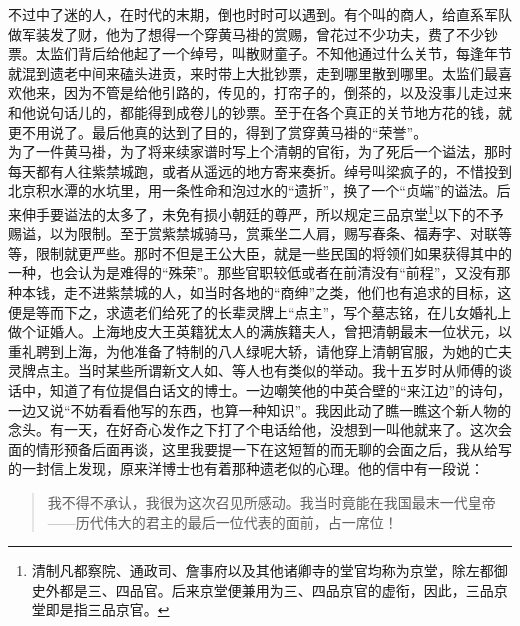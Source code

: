 不过中了迷的人，在时代的末期，倒也时时可以遇到。有个叫的商人，给直系军队做军装发了财，他为了想得一个穿黄马褂的赏赐，曾花过不少功夫，费了不少钞票。太监们背后给他起了一个绰号，叫散财童子。不知他通过什么关节，每逢年节就混到遗老中间来磕头进贡，来时带上大批钞票，走到哪里散到哪里。太监们最喜欢他来，因为不管是给他引路的，传见的，打帘子的，倒茶的，以及没事儿走过来和他说句话儿的，都能得到成卷儿的钞票。至于在各个真正的关节地方花的钱，就更不用说了。最后他真的达到了目的，得到了赏穿黄马褂的“荣誉”。\\

为了一件黄马褂，为了将来续家谱时写上个清朝的官衔，为了死后一个谥法，那时每天都有人往紫禁城跑，或者从遥远的地方寄来奏折。绰号叫梁疯子的，不惜投到北京积水潭的水坑里，用一条性命和泡过水的“遗折”，换了一个“贞端”的谥法。后来伸手要谥法的太多了，未免有损小朝廷的尊严，所以规定三品京堂\footnote{清制凡都察院、通政司、詹事府以及其他诸卿寺的堂官均称为京堂，除左都御史外都是三、四品官。后来京堂便兼用为三、四品京官的虚衔，因此，三品京堂即是指三品京官。}以下的不予赐谥，以为限制。至于赏紫禁城骑马，赏乘坐二人肩，赐写春条、福寿字、对联等等，限制就更严些。那时不但是王公大臣，就是一些民国的将领们如果获得其中的一种，也会认为是难得的“殊荣”。那些官职较低或者在前清没有“前程”，又没有那种本钱，走不进紫禁城的人，如当时各地的“商绅”之类，他们也有追求的目标，这便是等而下之，求遗老们给死了的长辈灵牌上“点主”，写个墓志铭，在儿女婚礼上做个证婚人。上海地皮大王英籍犹太人的满族籍夫人，曾把清朝最末一位状元，以重礼聘到上海，为他准备了特制的八人绿呢大轿，请他穿上清朝官服，为她的亡夫灵牌点主。当时某些所谓新文人如、等人也有类似的举动。我十五岁时从师傅的谈话中，知道了有位提倡白话文的博士。一边嘲笑他的中英合壁的“来江边”的诗句，一边又说“不妨看看他写的东西，也算一种知识”。我因此动了瞧一瞧这个新人物的念头。有一天，在好奇心发作之下打了个电话给他，没想到一叫他就来了。这次会面的情形预备后面再谈，这里我要提一下在这短暂的而无聊的会面之后，我从给写的一封信上发现，原来洋博士也有着那种遗老似的心理。他的信中有一段说：\\

\begin{quote}
	我不得不承认，我很为这次召见所感动。我当时竟能在我国最末一代皇帝——历代伟大的君主的最后一位代表的面前，占一席位！\\
\end{quote}

